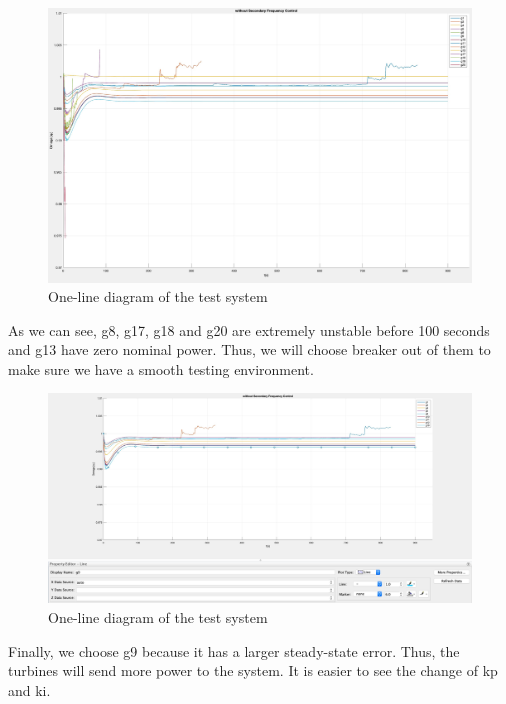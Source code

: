 \documentclass{report}
\begin{document}
\begin{figure}[htbp]
\centering
\includegraphics[width = \textwidth]{figure/4_1_1_without1.jpeg}
\caption{One-line diagram of the test system}
\label{4_1_1_without1}
\end{figure}

As we can see, g8, g17, g18 and g20 are extremely unstable before 100 seconds and g13 have zero nominal power. Thus, we will choose breaker out of them to make sure we have a smooth testing environment.\\


\begin{figure}[htbp]
\centering
\includegraphics[width = \textwidth]{figure/4_1_1_without2.jpeg}
\caption{One-line diagram of the test system}
\label{4_1_1_without2}
\end{figure}

Finally, we choose g9 because it has a larger steady-state error. Thus, the turbines will send more power to the system. It is easier to see the change of kp and ki.\\\\\\\\
\end{document}
